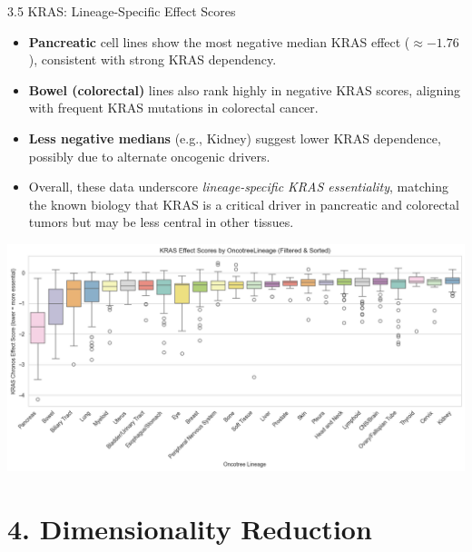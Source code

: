 \documentclass[10pt]{beamer}
\begin{document}
\begin{frame}{3.5 KRAS: Lineage-Specific Effect Scores}
  \begin{itemize}
    \item \textbf{Pancreatic} cell lines show the most negative median KRAS effect 
          ($\approx -1.76$), consistent with strong KRAS dependency.
    \item \textbf{Bowel (colorectal)} lines also rank highly in negative KRAS scores, 
          aligning with frequent KRAS mutations in colorectal cancer.
    \item \textbf{Less negative medians} (e.g., Kidney) suggest lower KRAS dependence, 
          possibly due to alternate oncogenic drivers.
    \item Overall, these data underscore \emph{lineage-specific KRAS essentiality}, 
          matching the known biology that KRAS is a critical driver in pancreatic 
          and colorectal tumors but may be less central in other tissues.
  \end{itemize}
    \begin{center}
      \includegraphics[width=0.74\linewidth]{figs/kras_lineage_boxplot.png}
    \end{center}
\end{frame}

\section{4. Dimensionality Reduction}
\end{document}
